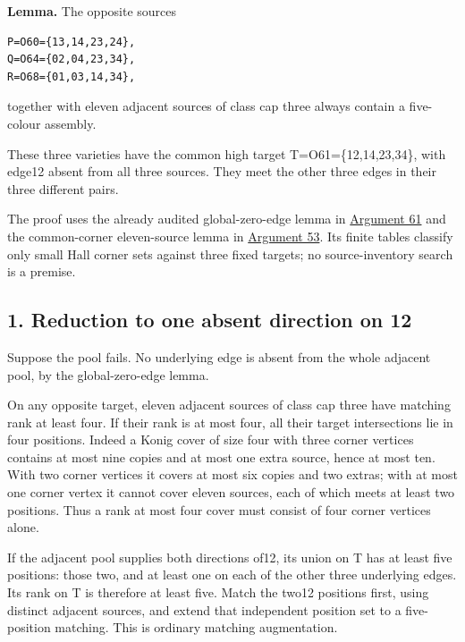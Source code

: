 \documentclass[
  10pt,
]{article}
\begin{document}
\textbf{Lemma.} The opposite sources

\begin{verbatim}
P=O60={13,14,23,24},
Q=O64={02,04,23,34},
R=O68={01,03,14,34},
\end{verbatim}

together with eleven adjacent sources of class cap three always contain
a five-colour assembly.

These three varieties have the common high target T=O61=\{12,14,23,34\},
with edge12 absent from all three sources. They meet the other three
edges in their three different pairs.

The proof uses the already audited global-zero-edge lemma in
\protect\hyperlink{arg-61}{Argument 61} and the common-corner
eleven-source lemma in \protect\hyperlink{arg-53}{Argument 53}. Its
finite tables classify only small Hall corner sets against three fixed
targets; no source-inventory search is a premise.

\hypertarget{reduction-to-one-absent-direction-on-12}{%
\subsection*{1. Reduction to one absent direction on
12}\label{reduction-to-one-absent-direction-on-12}}

Suppose the pool fails. No underlying edge is absent from the whole
adjacent pool, by the global-zero-edge lemma.

On any opposite target, eleven adjacent sources of class cap three have
matching rank at least four. If their rank is at most four, all their
target intersections lie in four positions. Indeed a Konig cover of size
four with three corner vertices contains at most nine copies and at most
one extra source, hence at most ten. With two corner vertices it covers
at most six copies and two extras; with at most one corner vertex it
cannot cover eleven sources, each of which meets at least two positions.
Thus a rank at most four cover must consist of four corner vertices
alone.

If the adjacent pool supplies both directions of12, its union on T has
at least five positions: those two, and at least one on each of the
other three underlying edges. Its rank on T is therefore at least five.
Match the two12 positions first, using distinct adjacent sources, and
extend that independent position set to a five-position matching. This
is ordinary matching augmentation.
\end{document}
